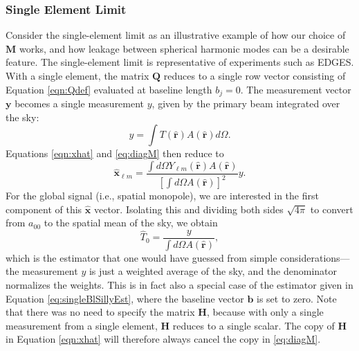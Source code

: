 \documentclass[twocolumn,apj,numberedappendix]{emulateapj}
\newcommand{\Hmat}{\mathbf{H}}
\newcommand{\M}{\mathbf{M}}
\begin{document}
\subsubsection{Single Element Limit}

Consider the single-element limit as an illustrative example of how our choice of $\M$ works, and how leakage between spherical harmonic modes can be a desirable feature. The single-element limit is representative of experiments such as EDGES. With a single element, the matrix $\mathbf{Q}$ reduces to a single row vector consisting of Equation \eqref{eqn:Qdef} evaluated at baseline length $b_j=0$. The measurement vector $\mathbf{y}$ becomes a single measurement $y$, given by the primary beam integrated over the sky:
\begin{equation}
y = \int T(\mathbf{\hat{r}}) A(\mathbf{\hat{r}}) d\Omega.
\end{equation}
Equations \eqref{eqn:xhat} and \eqref{eq:diagM} then reduce to
\begin{equation}
\mathbf{\hat{x}}_{\ell m} = \frac{\int d\Omega Y_{\ell m} (\mathbf{\hat{r}}) A(\mathbf{\hat{r}})}{\left[ \int d\Omega A(\mathbf{\hat{r}}) \right]^2} y.
\end{equation}
For the global signal (i.e., spatial monopole), we are interested in the first component of this $\mathbf{\hat{x}}$ vector. Isolating this and dividing both sides $\sqrt{4\pi}$ to convert from $a_{00}$ to the spatial mean of the sky, we obtain
\begin{equation}
\label{eq:singleElementExtraction}
\widehat{T}_0 = \frac{y}{ \int d\Omega A(\mathbf{\hat{r}}) },
\end{equation}
which is the estimator that one would have guessed from simple considerations---the measurement $y$ is just a weighted average of the sky, and the denominator normalizes the weights. This is in fact also a special case of the estimator given in Equation \eqref{eq:singleBlSillyEst}, where the baseline vector $\mathbf{b}$ is set to zero. Note that there was no need to specify the matrix $\Hmat$, because with only a single measurement from a single element, $\Hmat$ reduces to a single scalar. The copy of $\Hmat$ in Equation \eqref{eqn:xhat} will therefore always cancel the copy in \eqref{eq:diagM}.
%
\end{document}
